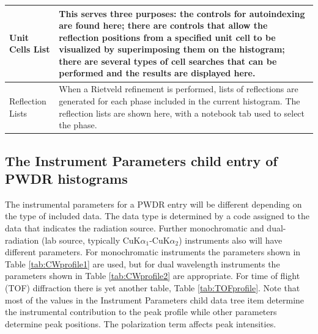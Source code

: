 \begin{table}
\begin{tabular}{| l | p{} |}
\hline
Unit Cells List & This serves three purposes: the controls for autoindexing are found here; there are controls that allow the reflection positions from a specified unit cell to be visualized by superimposing them on the histogram; there are several types of cell searches that can be performed and the results are displayed here.\\
\hline
Reflection Lists & When a Rietveld refinement is performed, lists of reflections are generated for each phase included in the current histogram. The reflection lists are shown here, with a notebook tab used to select the phase.\\
\hline
\end{tabular}
\end{table}

\subsection{The Instrument Parameters child entry of PWDR histograms}
The instrumental parameters for a PWDR entry will be different depending on the type of included data. 
The data type is determined by a code assigned to the data that indicates the radiation source. 
Further monochromatic and dual-radiation (lab source, typically CuK$\alpha_1$-CuK$\alpha_2$) instruments also will have different parameters. 
For monochromatic instruments the parameters  shown in Table \ref{tab:CWprofile1} are used, but for dual wavelength instruments the parameters shown in Table \ref{tab:CWprofile2} are appropriate. 
For time of flight (TOF) diffraction there is yet another table, Table \ref{tab:TOFprofile}.
Note that most of the values in the Instrument Parameters child data tree item determine the instrumental contribution to the peak profile while other parameters determine peak positions. The polarization term affects peak intensities.

